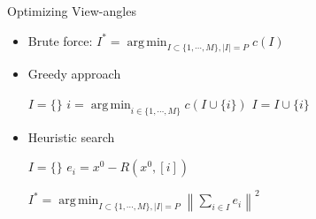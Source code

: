 \documentclass[english,aspectratio=43]{beamer}
\DeclareMathOperator*{\argmin}{arg\,min}
\newcommand{\norm}[1]{\left\lVert#1\right\rVert}
\begin{document}
            
            
            


\begin{frame}{Optimizing View-angles}
	\begin{itemize}
	    \setlength\itemsep{2em}
	    
	    \item Brute force: $I^* = \argmin_{I \subset \{ 1, \cdots, M \}, |I|=P} c(I)  $
	        
		\item Greedy approach
		
		\begin{algorithm}[H]
        \begin{algorithmic}[1]
        \STATE $I = \{\}$
            \STATE  $i = \argmin_{i \in \{1,\cdots,M \} } c(I \cup \{ i \})$
            \STATE $I = I \cup \{ i \}$
        \ENDWHILE
        
        \end{algorithmic}
        \label{alg:angle_greedy}
        \end{algorithm}
        
        \item Heuristic search
        
        \begin{algorithm}[H]
        \begin{algorithmic}[1]
        \STATE $I = \{\}$
            \STATE $ e_i = x^0 - R(x^0,[i]) $
        \ENDFOR
        
        \STATE $I^* = \argmin_{I \subset \{ 1, \cdots, M \}, |I|=P} \norm{\sum_{i \in I} e_i}^2  $
        \end{algorithmic}
        \label{alg:angle_heuristic}
        \end{algorithm}
        
        
	\end{itemize}
	
\end{frame}
\end{document}
